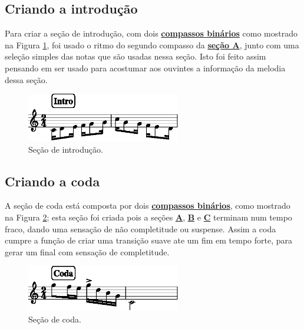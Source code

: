 \subsection{Criando a introdução}
Para criar a seção de introdução, 
com dois \hyperref[subsec:compassobinario]{\textbf{compassos binários}} como mostrado na Figura \ref{fig:section-intro},
foi usado o ritmo do segundo compasso da \hyperref[subsec:criandoa]{\textbf{seção A}},
junto com uma seleção simples das notas que são usadas nessa seção. 
Isto foi feito assim pensando em ser usado para acostumar aos ouvintes a informação da melodia dessa seção.
     \begin{figure}[H]
	     \centering
	     \includegraphics[width=0.6\textwidth]{chapters/cap-musica-topicos/section-intro-1.eps}
	     \caption{Seção de introdução.}
	     \label{fig:section-intro}
     \end{figure}

\subsection{Criando a coda}
A seção de coda está composta por dois \hyperref[subsec:compassobinario]{\textbf{compassos binários}}, 
como mostrado na Figura \ref{fig:section-coda};
esta seção foi criada pois a seções 
\hyperref[subsec:criandoa]{\textbf{A}},
\hyperref[subsec:criandob]{\textbf{B}} e
\hyperref[subsec:criandoc]{\textbf{C}}
terminam num tempo fraco, dando uma sensação de não completitude ou suspense.
Assim a coda cumpre a função de criar uma transição suave ate um fim em tempo forte,
para gerar um final com sensação de completitude.
     \begin{figure}[H]
	     \centering
	     \includegraphics[width=0.6\textwidth]{chapters/cap-musica-topicos/section-coda-1.eps}
	     \caption{Seção de coda.}
	     \label{fig:section-coda}
     \end{figure}


